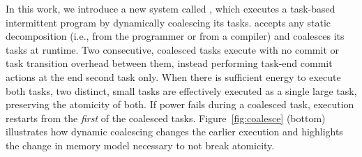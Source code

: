 
In this work, we introduce a new system called \sys, which executes a task-based
intermittent program by dynamically coalescing its tasks.
\sys accepts any static decomposition (i.e., from the programmer or from a compiler) 
and coalesces its tasks at runtime. Two consecutive, coalesced tasks execute  
with no commit or task transition overhead between them, instead performing
task-end commit actions at the end second task only.
%
When there is sufficient energy to execute both tasks, two distinct, small
tasks are effectively executed as a single large task, preserving the atomicity
of both.  If power fails during a coalesced task, execution restarts from the
{\em first} of the coalesced tasks.  Figure~\ref{fig:coalesce} (bottom)
illustrates how dynamic coalescing changes the earlier execution and highlights
the change in memory model necessary to not break atomicity.



